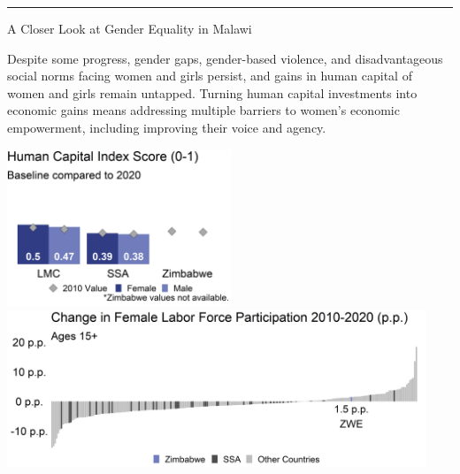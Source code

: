 \documentclass[
]{article}
\begin{document}
\vspace{.3cm}

\centering\rule{19.5cm}{0.5pt}

\vspace{.3cm}

\begin{minipage}[c][1.65cm][t]{19.5cm}
\begin{minipage}[c][1.65cm][t]{6cm}
\begin{spacing}{2}\fontsize{14}{1}\selectfont   
A Closer Look at Gender Equality in Malawi
\normalsize
\end{spacing}\end{minipage}\hspace{0.5cm}
\begin{minipage}[c][1.65cm][t]{12.75cm}
\fontsize{9}{8}\selectfont   
Despite some progress, gender gaps, gender-based violence, and disadvantageous social norms facing women and girls persist, and gains in human capital of women and girls remain untapped. Turning human capital investments into economic gains means addressing multiple barriers to women’s economic empowerment, including improving their voice and agency.
\normalsize
\end{minipage}
\end{minipage}

\vspace{.15cm}

\begin{minipage}[t][4.7cm][t]{19.5cm}
\href{https://genderdata.worldbank.org/indicators/hd-hci-ovrl}{\includegraphics[height=4.7cm]{HCIplot.png}}\hspace{.2cm}
\href{https://genderdata.worldbank.org/indicators/sl-tlf-acti-zs/}{\includegraphics[height=4.7cm]{LFPplot.png}}  
\end{minipage}
\end{document}
